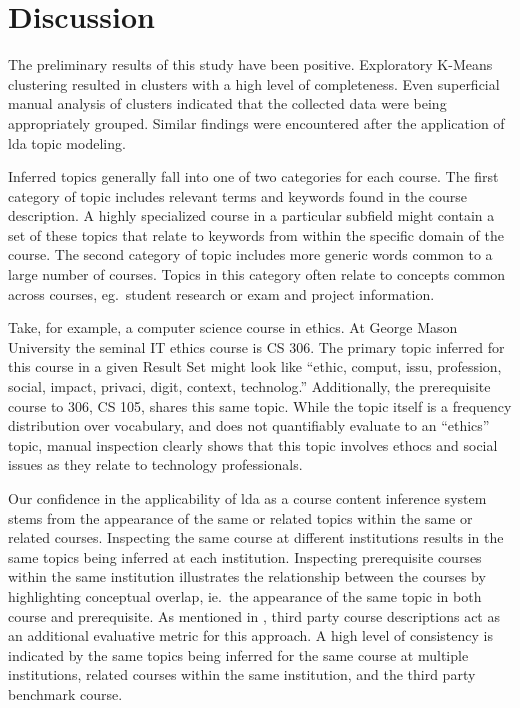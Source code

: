 \section{Discussion}
\label{sec:discussion}


The preliminary results of this study have been positive.
Exploratory K-Means clustering resulted in clusters with a high level of completeness.
Even superficial manual analysis of clusters indicated that the collected data were being appropriately grouped.
Similar findings were encountered after the application of \ac{lda} topic modeling.


Inferred topics generally fall into one of two categories for each course.
The first category of topic includes relevant terms and keywords found in the course description.
A highly specialized course in a particular subfield might contain a set of these topics that relate to keywords from within the specific domain of the course.
The second category of topic includes more generic words common to a large number of courses.
Topics in this category often relate to concepts common across courses, eg.\ student research or exam and project information.


Take, for example, a computer science course in ethics.
At George Mason University the seminal IT ethics course is CS 306.
The primary topic inferred for this course in a given Result Set might look like ``ethic, comput, issu, profession, social, impact, privaci, digit, context, technolog.''
Additionally, the prerequisite course to 306, CS 105, shares this same topic.
While the topic itself is a frequency distribution over vocabulary, and does not quantifiably evaluate to an ``ethics'' topic, manual inspection clearly shows that this topic involves ethocs and social issues as they relate to technology professionals.


Our confidence in the applicability of \ac{lda} as a course content inference system stems from the appearance of the same or related topics within the same or related courses.
Inspecting the same course at different institutions results in the same topics being inferred at each institution.
Inspecting prerequisite courses within the same institution illustrates the relationship between the courses by highlighting conceptual overlap, ie.\ the appearance of the same topic in both course and prerequisite.
As mentioned in , third party course descriptions act as an additional evaluative metric for this approach.
A high level of consistency is indicated by the same topics being inferred for the same course at multiple institutions, related courses within the same institution, and the third party benchmark course.


